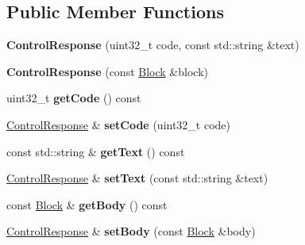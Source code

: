 \subsection*{Public Member Functions}
\begin{DoxyCompactItemize}
\item 
{\bfseries Control\+Response} (uint32\+\_\+t code, const std\+::string \&text)\hypertarget{classndn_1_1mgmt_1_1ControlResponse_acfb9241d406cdd946ddf80e45b02428e}{}\label{classndn_1_1mgmt_1_1ControlResponse_acfb9241d406cdd946ddf80e45b02428e}

\item 
{\bfseries Control\+Response} (const \hyperlink{classndn_1_1Block}{Block} \&block)\hypertarget{classndn_1_1mgmt_1_1ControlResponse_ad668e8fb5ca22579cb66e22cf3d5e5b1}{}\label{classndn_1_1mgmt_1_1ControlResponse_ad668e8fb5ca22579cb66e22cf3d5e5b1}

\item 
uint32\+\_\+t {\bfseries get\+Code} () const\hypertarget{classndn_1_1mgmt_1_1ControlResponse_a97727d3a7b8bdbcb5367a06462b0f64f}{}\label{classndn_1_1mgmt_1_1ControlResponse_a97727d3a7b8bdbcb5367a06462b0f64f}

\item 
\hyperlink{classndn_1_1mgmt_1_1ControlResponse}{Control\+Response} \& {\bfseries set\+Code} (uint32\+\_\+t code)\hypertarget{classndn_1_1mgmt_1_1ControlResponse_ac7c0b5a20974b60571df95bf026e308b}{}\label{classndn_1_1mgmt_1_1ControlResponse_ac7c0b5a20974b60571df95bf026e308b}

\item 
const std\+::string \& {\bfseries get\+Text} () const\hypertarget{classndn_1_1mgmt_1_1ControlResponse_adff01833a16892bccb903da48e08035e}{}\label{classndn_1_1mgmt_1_1ControlResponse_adff01833a16892bccb903da48e08035e}

\item 
\hyperlink{classndn_1_1mgmt_1_1ControlResponse}{Control\+Response} \& {\bfseries set\+Text} (const std\+::string \&text)\hypertarget{classndn_1_1mgmt_1_1ControlResponse_aa77c94f5ce353c195b87b6cafe511894}{}\label{classndn_1_1mgmt_1_1ControlResponse_aa77c94f5ce353c195b87b6cafe511894}

\item 
const \hyperlink{classndn_1_1Block}{Block} \& {\bfseries get\+Body} () const\hypertarget{classndn_1_1mgmt_1_1ControlResponse_a65470499ab65b06c046de8459f664600}{}\label{classndn_1_1mgmt_1_1ControlResponse_a65470499ab65b06c046de8459f664600}

\item 
\hyperlink{classndn_1_1mgmt_1_1ControlResponse}{Control\+Response} \& {\bfseries set\+Body} (const \hyperlink{classndn_1_1Block}{Block} \&body)\hypertarget{classndn_1_1mgmt_1_1ControlResponse_a8df9546cdae70e445776e5c3ddbcfed7}{}\label{classndn_1_1mgmt_1_1ControlResponse_a8df9546cdae70e445776e5c3ddbcfed7}


\end{DoxyCompactItemize}
